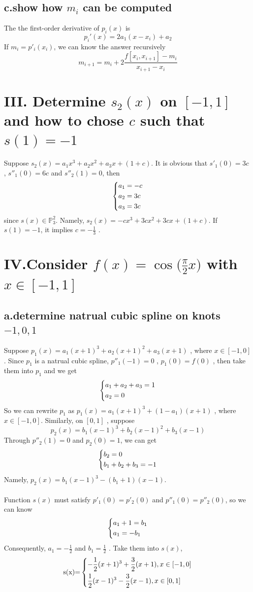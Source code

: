\documentclass[twoside,a4paper]{article}
\begin{document}
\subsection*{c.show how $m_i$ can be computed}
The the first-order derivative of $p_i(x)$ is 
\[
p_i'(x)=2a_1(x-x_i)+a_2
\]
If $m_{i}=p'_{i}(x_i)$, we can know the answer recursively
\[
m_{i+1}=m_i+2\frac{f[x_i,x_{i+1}]-m_i}{x_{i+1}-x_i}
\]
\section*{III. Determine $s_2(x)$ on $[-1,1]$ and how to chose $c$ such that $s(1)=-1$}
Suppose $s_2(x)=a_1x^3+a_2x^2+a_3x+(1+c)$. It is obvious that $s'_1(0)=3c$ , $s''_1(0)=6c$ and $s''_2(1)=0$, then
\[
\left\{
\begin{lgathered}
a_1=-c\\
a_2=3c\\
a_3=3c\\
\end{lgathered} 
\right.
\]
since $s(x)\in \mathbb{P}_3^2$. Namely, $s_2(x)=-cx^3+3cx^2+3cx+(1+c)$. If $s(1)=-1$, it implies $c=-\frac{1}{3}$ .
\section*{IV.Consider $f(x)=\cos{(\frac{\pi}{2}x})$ with $x\in[-1,1]$}
\subsection*{a.determine natrual cubic spline on knots $-1,0,1$}
Suppose $p_1(x)=a_1(x+1)^3+a_2(x+1)^2+a_3(x+1)$ , where $x \in [-1,0]$. Since $p_1$ is a natrual cubic spline, $p''_1(-1)=0$ , $p_1(0)=f(0)$ , then take them into $p_1$ and we get
\[
\left\{
\begin{lgathered}
a_1+a_2+a_3=1\\
a_2=0\\
\end{lgathered} 
\right.
\]
So we can rewrite $p_1$ as $p_1(x)=a_1(x+1)^3+(1-a_1)(x+1)$ , where $x\in[-1,0]$.  Similarly, on $[0,1]$ , suppose 
\[
p_2(x)=b_1(x-1)^3+b_2(x-1)^2+b_3(x-1)
\]
Through $p''_2(1)=0$ and $p_2(0)=1$, we can get
\[
\left\{
\begin{lgathered}
b_2=0\\
b_1+b_2+b_3=-1
\end{lgathered} 
\right.
\]
Namely, $p_2(x)=b_1(x-1)^3-(b_1+1)(x-1)$.\\
\\
Function $s(x)$ must satisfy $p'_1(0)=p'_2(0)$ and $p''_1(0)=p''_2(0)$, so we can know
\[
\left\{
\begin{lgathered}
a_1+1=b_1\\
a_1=-b_1
\end{lgathered} 
\right.
\]
Consequently, $a_1=-\frac{1}{2}$ and $b_1=\frac{1}{2}$ . Take them into $s(x)$,
\[\text{s(x)=}
\left\{
\begin{lgathered}
-\frac{1}{2}(x+1)^3+\frac{3}{2}(x+1) , x \in [-1,0]\\
\frac{1}{2}(x-1)^3-\frac{3}{2}(x-1) , x \in [0,1]
\end{lgathered} 
\right.
\]
\end{document}
